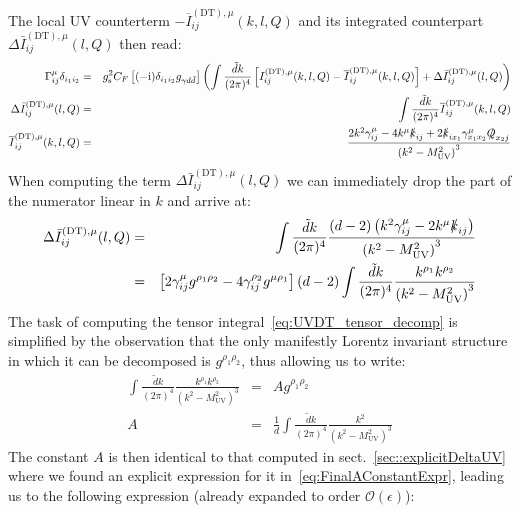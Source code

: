 \documentclass[11pt]{article}
\begin{document}
The local UV counterterm $-\overline{I}^{(\textrm{DT}),\mu}_{ij}(k,l,Q)$ and its integrated counterpart $\Delta\bar{I}^{(\textrm{DT}),\mu}_{ij}(l,Q)$ then read:
\begin{eqnarray}
\Gamma^\mu_{ij}\delta_{i_1 i_2} &=& g_\textrm{s}^2 C_F \left [ (-\textrm{i}) \delta_{i_1 i_2} g_{\gamma d\bar{d}} \right] \left( \int \frac{\tilde{d} k}{(2\pi)^4} \left[ I^{(\textrm{DT}),\mu}_{ij}(k,l,Q)-\overline{I}^{(\textrm{DT}),\mu}_{ij}(k,l,Q) \right ] + \Delta\bar{I}^{(\textrm{DT}),\mu}_{ij}(l,Q) \right) \nonumber\\
\Delta\bar{I}^{(\textrm{DT}),\mu}_{ij}(l,Q) &=& \int \frac{\tilde{d} k}{(2\pi)^4} \overline{I}^{(\textrm{DT}),\mu}_{ij}(k,l,Q) \nonumber\\
\overline{I}^{(\textrm{DT}),\mu}_{ij}(k,l,Q) &=& \frac{2 k^2 \gamma^\mu_{ij} -4 k^\mu \slashed{k}_{ij} + 2 \slashed{k}_{i x_1}\gamma^\mu_{x_1 x_2} \slashed{Q}_{x_2 j} }{\left( k^2-M_{\textrm{UV}}^2\right)^3}
\end{eqnarray}
When computing the term $\Delta\bar{I}^{(\textrm{DT}),\mu}_{ij}(l,Q)$ we can immediately drop the part of the numerator linear in $k$ and arrive at:
\begin{eqnarray}
\Delta\bar{I}^{(\textrm{DT}),\mu}_{ij}(l,Q) &=& \int \frac{\tilde{d} k}{(2\pi)^4} \frac{(d-2) \left( k^2 \gamma^\mu_{ij} -2 k^\mu \slashed{k}_{ij}\right) }{\left( k^2-M_{\textrm{UV}}^2\right)^3} \nonumber \\
&=& \left [ 2 \gamma^\mu_{ij} g^{\rho_1 \rho_2} -4 \gamma^{\rho_2}_{ij} g^{\mu \rho_1} \right ] (d-2) \int \frac{\tilde{d} k}{(2\pi)^4} \frac{k^{\rho_1}k^{\rho_2}}{\left( k^2-M_{\textrm{UV}}^2\right)^3} \label{eq:UVDT_tensor_decomp}
\end{eqnarray}
The task of computing the tensor integral~\eqref{eq:UVDT_tensor_decomp} is simplified by the observation that the only manifestly Lorentz invariant structure in which it can be decomposed is $g^{\rho_1\rho_2}$, thus allowing us to write:
\begin{eqnarray}
\int \frac{\tilde{d} k}{(2\pi)^4} \frac{k^{\rho_1}k^{\rho_2}}{\left( k^2-M_{\textrm{UV}}^2\right)^3} &=& A g^{\rho_1\rho_2} \nonumber \\
A &=& \frac{1}{d} \int \frac{\tilde{d} k}{(2\pi)^4} \frac{k^2}{\left( k^2-M_{\textrm{UV}}^2\right)^3}
\end{eqnarray}
The constant $A$ is then identical to that computed in sect.~\ref{sec::explicitDeltaUV} where we found an explicit expression for it in~\eqref{eq:FinalAConstantExpr}, leading us to the following expression (already expanded to order $\mathcal{O}(\epsilon)$):
\end{document}
